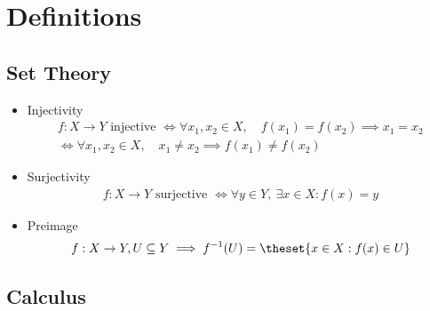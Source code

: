 \hypertarget{definitions-4}{%
\section{Definitions}\label{definitions-4}}

\hypertarget{set-theory}{%
\subsection{Set Theory}\label{set-theory}}

\begin{itemize}
\item
  Injectivity
  \begin{align*}
    f:X \to Y \text{ injective } \iff \forall x_1,x_2 \in X,\quad  f(x_1) = f(x_2) \implies x_1 = x_2 \\ \iff \forall x_1,x_2 \in X,\quad x_1 \neq x_2 \implies f(x_1) \neq f(x_2)
    \end{align*}
\item
  Surjectivity
  \begin{align*}
    f:X \to Y \text{ surjective } \iff \forall y\in Y,~ \exists x\in X : f(x) = y
    \end{align*}
\item
  Preimage
  \begin{align*}
    f:X \to Y, U \subseteq Y \implies f^{-1}(U) = \theset{x \in X : f(x) \in U}
    \end{align*}
\end{itemize}

\hypertarget{calculus}{%
\subsection{Calculus}\label{calculus}}

